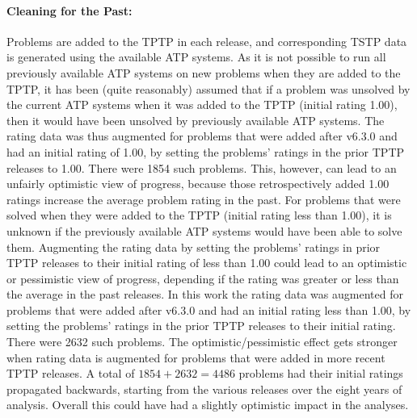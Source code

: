\documentclass[runningheads]{llncs}
\begin{document}
\paragraph{Cleaning for the Past:}
Problems are added to the TPTP in each release, and corresponding TSTP data is generated using 
the available ATP systems.
As it is not possible to run all previously available ATP systems on new problems when they 
are added to the TPTP, it has been (quite reasonably) assumed that if a problem was unsolved by the 
current ATP systems when it was added to the TPTP (initial rating 1.00), then it would have been 
unsolved by previously available ATP systems.
The rating data was thus augmented for problems that were added after v6.3.0 and had an
initial rating of 1.00, by setting the problems' ratings in the prior TPTP releases to 1.00.
There were 1854 such problems.
This, however, can lead to an unfairly optimistic view of progress, because those retrospectively 
added 1.00 ratings increase the average problem rating in the past.
For problems that were solved when they were added to the TPTP (initial rating less than 1.00),
it is unknown if the previously available ATP systems would have been able to solve them.
Augmenting the rating data by setting the problems' ratings in prior TPTP releases to their 
initial rating of less than 1.00 could lead to an optimistic or pessimistic view of progress, 
depending if the rating was greater or less than the average in the past releases.
In this work the rating data was augmented for problems that were added after v6.3.0 and 
had an initial rating less than 1.00, by setting the problems' ratings in the prior TPTP releases 
to their initial rating.
There were 2632 such problems.
The optimistic/pessimistic effect gets stronger when rating data is augmented for problems that
were added in more recent TPTP releases. 
A total of $1854+2632=4486$ problems had their initial ratings propagated backwards, starting
from the various releases over the eight years of analysis.
Overall this could have had a slightly optimistic impact in the analyses.

\vspace*{-0.5em}
\end{document}

